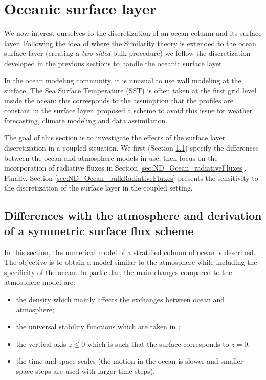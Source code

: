 \section{Oceanic surface layer}
\label{sec:ND_Ocean}
We now interest ourselves to the discretization of an ocean
column and its surface layer.
Following the idea of \citep{pelletier_two-sided_2021} where
the Similarity theory is extended to the ocean surface layer
(creating a \textit{two-sided} bulk procedure) we
follow the discretization developed in the previous sections
to handle the oceanic surface layer.
%
\par
In the ocean modeling community, it is unusual to use
wall modeling at the surface. The Sea Surface Temperature
(SST) is often taken at the first grid level inside the
ocean: this corresponds to the assumption that 
the profiles are constant in the surface layer.
\cite{zeng_prognostic_2005} proposed a scheme to avoid this
issue for weather forecasting, climate modeling and
data assimilation.
%
\par
The goal of this section is to investigate the effects
of the surface layer discretization in a coupled situation.
We first (Section \ref{sec:ND_Ocean_differencesWithAtmosphere})
specify the differences between the ocean and
atmosphere models in use,
then focus on the incorporation of radiative fluxes in
Section \ref{sec:ND_Ocean_radiativeFluxes}.
Finally, Section \ref{sec:ND_Ocean_bulkRadiativeFluxes}
presents the sensitivity to the discretization of the
surface layer in the coupled setting.
\subsection{Differences with the atmosphere and derivation of
	a symmetric surface flux scheme}
\label{sec:ND_Ocean_differencesWithAtmosphere}
In this section, the numerical model of a stratified column
of ocean is described. The objective is to obtain a model
similar to the atmosphere while including the specificity
of the ocean.
In particular, the main changes compared to the atmosphere
model are:
\begin{itemize}
	\item the density which mainly affects the exchanges
		between ocean and atmosphere;
	\item the universal stability functions which are
		taken in \cite{large_similarity_2019};
	\item the vertical axis $z \leq 0$
		which is such that the surface corresponds to $z=0$;
	\item the time and space scales (the motion in the ocean
		is slower and smaller space steps are used with
		larger time steps).
\end{itemize}
